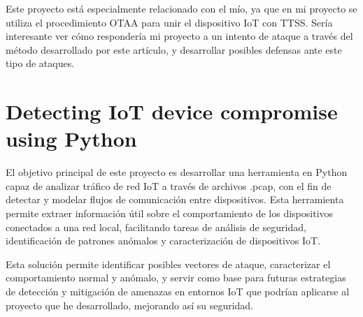 Este proyecto está especialmente relacionado con el mío, ya que en mi proyecto se utiliza el procedimiento OTAA para unir el dispositivo IoT con TTSS. Sería interesante ver cómo respondería mi proyecto a un intento de ataque a través del método desarrollado por este artículo, y desarrollar posibles defensas ante este tipo de ataques.



\section{Detecting IoT device compromise using Python}

El objetivo principal de este proyecto \cite{Rel3} es desarrollar una herramienta en Python capaz de analizar tráfico de red IoT a través de archivos .pcap, con el fin de detectar y modelar flujos de comunicación entre dispositivos. Esta herramienta permite extraer información útil sobre el comportamiento de los dispositivos conectados a una red local, facilitando tareas de análisis de seguridad, identificación de patrones anómalos y caracterización de dispositivos IoT.

 Esta solución permite identificar posibles vectores de ataque, caracterizar el comportamiento normal y anómalo, y servir como base para futuras estrategias de detección y mitigación de amenazas en entornos IoT que podrían aplicarse al proyecto que he desarrollado, mejorando así su seguridad. 

 
